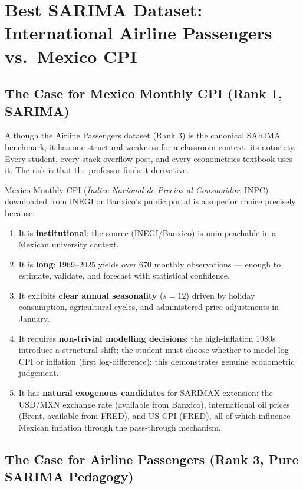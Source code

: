 \documentclass[12pt,a4paper]{article}
\begin{document}
\section{Best SARIMA Dataset: International Airline Passengers vs.\ Mexico CPI}

\subsection{The Case for Mexico Monthly CPI (Rank 1, SARIMA)}

Although the Airline Passengers dataset (Rank 3) is the canonical SARIMA
benchmark, it has one structural weakness for a classroom context: its notoriety.
Every student, every stack-overflow post, and every econometrics textbook uses it.
The risk is that the professor finds it derivative.

Mexico Monthly CPI (\textit{Índice Nacional de Precios al Consumidor}, INPC)
downloaded from INEGI or Banxico's public portal is a superior choice precisely
because:

\begin{enumerate}[noitemsep]
  \item It is \textbf{institutional}: the source (INEGI/Banxico) is unimpeachable
  in a Mexican university context.
  \item It is \textbf{long}: 1969–2025 yields over 670 monthly observations —
  enough to estimate, validate, and forecast with statistical confidence.
  \item It exhibits \textbf{clear annual seasonality} ($s=12$) driven by holiday
  consumption, agricultural cycles, and administered price adjustments in January.
  \item It requires \textbf{non-trivial modelling decisions}: the high-inflation
  1980s introduce a structural shift; the student must choose whether to model
  log-CPI or inflation (first log-difference); this demonstrates genuine
  econometric judgement.
  \item It has \textbf{natural exogenous candidates} for SARIMAX extension: the
  USD/MXN exchange rate (available from Banxico), international oil prices (Brent,
  available from FRED), and US CPI (FRED), all of which influence Mexican inflation
  through the pass-through mechanism.
\end{enumerate}

\subsection{The Case for Airline Passengers (Rank 3, Pure SARIMA Pedagogy)}
\end{document}

